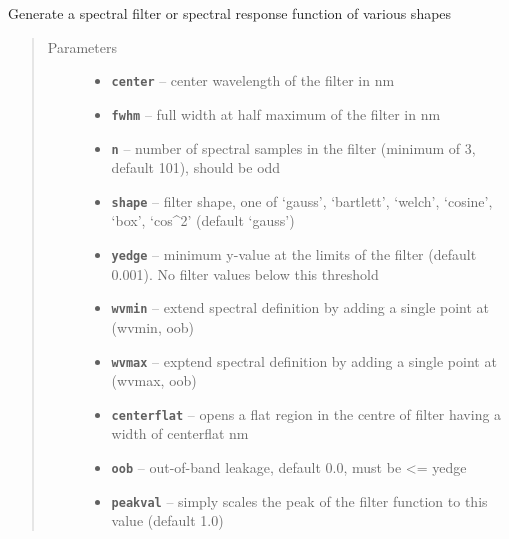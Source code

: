 \documentclass[a4paper,10pt,english]{sphinxmanual}
\begin{document}
\begin{fulllineitems}
\label{packages:radute.srfgen}
Generate a spectral filter or spectral response function of various shapes
\begin{quote}\begin{description}
\item[{Parameters}] \leavevmode\begin{itemize}
\item {} 
\textbf{\texttt{center}} -- center wavelength of the filter in nm

\item {} 
\textbf{\texttt{fwhm}} -- full width at half maximum of the filter  in nm

\item {} 
\textbf{\texttt{n}} -- number of spectral samples in the filter (minimum of 3, default 101), should be odd

\item {} 
\textbf{\texttt{shape}} -- filter shape, one of `gauss', `bartlett', `welch', `cosine', `box', `cos\textasciicircum{}2' (default `gauss')

\item {} 
\textbf{\texttt{yedge}} -- minimum y-value at the limits of the filter (default 0.001). No filter values below this threshold

\item {} 
\textbf{\texttt{wvmin}} -- extend spectral definition by adding a single point at (wvmin, oob)

\item {} 
\textbf{\texttt{wvmax}} -- exptend spectral definition by adding a single point at (wvmax, oob)

\item {} 
\textbf{\texttt{centerflat}} -- opens a flat region in the centre of filter having a width of centerflat nm

\item {} 
\textbf{\texttt{oob}} -- out-of-band leakage, default 0.0, must be \textless{}= yedge

\item {} 
\textbf{\texttt{peakval}} -- simply scales the peak of the filter function to this value (default 1.0)


\end{itemize}
\end{description}
\end{quote}
\end{fulllineitems}
\end{document}
